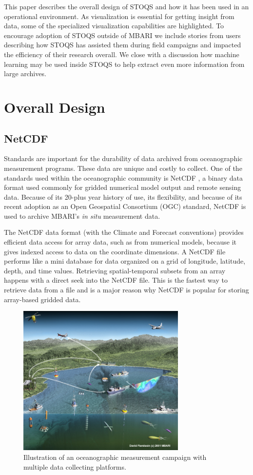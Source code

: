 \documentclass[conference]{IEEEtran}
\begin{document}
This paper describes the overall design of STOQS and how it has been used in an operational environment. As visualization is essential for getting insight from data, some of the specialized visualization capabilities are highlighted. To encourage adoption of STOQS outside of MBARI we include stories from users describing how STOQS has assisted them during field campaigns and impacted the efficiency of their research overall. We close with a discussion how machine learning may be used inside STOQS to help extract even more information from large archives.


\section{Overall Design}

\subsection{NetCDF}

Standards are important for the durability of data archived from oceanographic measurement programs. These data are unique and costly to collect. One of the standards used within the oceanographic community is NetCDF \cite{Rew1990}, a binary data format used commonly for gridded numerical model output and remote sensing data. Because of its 20-plus year history of use, its flexibility, and because of its recent adoption as an Open Geospatial Consortium (OGC) standard, NetCDF is used to archive MBARI's \textit{in situ} measurement data.

The NetCDF data format (with the Climate and Forecast conventions) provides efficient data access for array data, such as from numerical models, because it gives indexed access to data on the coordinate dimensions. A NetCDF file performs like a mini database for data organized on a grid of longitude, latitude, depth, and time values. Retrieving spatial-temporal subsets from an array happens with a direct seek into the NetCDF file. This is the fastest way to retrieve data from a file and is a major reason why NetCDF is popular for storing array-based gridded data.

\begin{figure}[htbp]
\centering
\includegraphics[width=3.3in]{MUSE_illus_pp.jpg}
\caption{Illustration of an oceanographic measurement campaign with multiple data collecting platforms.}
\label{fig:MUSE_illus_pp}
\end{figure}
\end{document}
